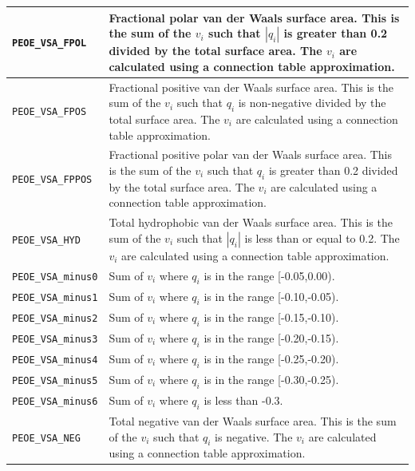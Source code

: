 \documentclass[12pt,a4paper]{article}
\begin{document}
\begin{longtable}{@{\zz}|p{}|p{}|}
\texttt{PEOE\_VSA\_FPOL} & Fractional polar van der Waals surface area. 
This is the sum of the $v_i$ such that $|q_i|$ is greater than 0.2 
divided by the total surface area. The $v_i$ are calculated using a 
connection table approximation.\\ \hline

\texttt{PEOE\_VSA\_FPOS} & Fractional positive van der Waals surface 
area. This is the sum of the $v_i$ such that $q_i$ is non-negative 
divided by the total surface area. The $v_i$ are calculated using a 
connection table approximation.\\ \hline

\texttt{PEOE\_VSA\_FPPOS} & Fractional positive polar van der Waals 
surface area. This is the sum of the $v_i$ such that $q_i$ is 
greater than 0.2 divided by the total surface area. The $v_i$ are 
calculated using a connection table approximation.\\ \hline

\texttt{PEOE\_VSA\_HYD} & Total hydrophobic van der Waals surface area. 
This is the sum of the $v_i$ such that $|q_i|$ is less than or equal 
to 0.2. The $v_i$ are calculated using a connection table approximation.\\ 
\hline

\texttt{PEOE\_VSA\_minus0} & Sum of $v_i$ where $q_i$ is in the range 
[-0.05,0.00).\\ \hline

\texttt{PEOE\_VSA\_minus1} & Sum of $v_i$ where $q_i$ is in the range 
[-0.10,-0.05).\\ \hline

\texttt{PEOE\_VSA\_minus2} & Sum of $v_i$ where $q_i$ is in the range 
[-0.15,-0.10).\\ \hline

\texttt{PEOE\_VSA\_minus3} & Sum of $v_i$ where $q_i$ is in the range 
[-0.20,-0.15).\\ \hline

\texttt{PEOE\_VSA\_minus4} & Sum of $v_i$ where $q_i$ is in the range 
[-0.25,-0.20).\\ \hline

\texttt{PEOE\_VSA\_minus5} & Sum of $v_i$ where $q_i$ is in the range 
[-0.30,-0.25).\\ \hline

\texttt{PEOE\_VSA\_minus6} & Sum of $v_i$ where $q_i$ is less than -0.3.\\ 
\hline

\texttt{PEOE\_VSA\_NEG} & Total negative van der Waals surface area. 
This is the sum of the $v_i$ such that $q_i$ is negative. The $v_i$ 
are calculated using a connection table approximation.\\ \hline


\end{longtable}
\end{document}

